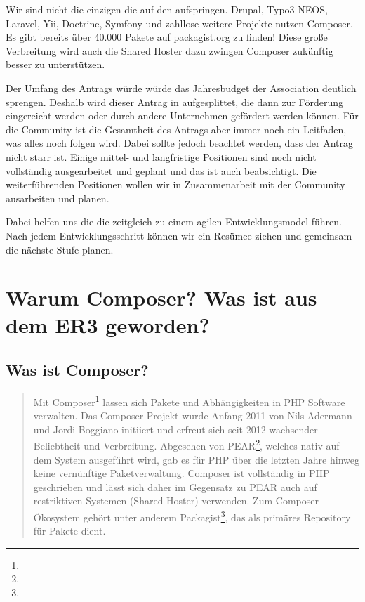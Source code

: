 \documentclass[
paper=a4,
draft=false,%
fontsize=10pt%
]{scrartcl}
\begin{document}
Wir sind nicht die einzigen die auf den  aufspringen. Drupal, Typo3 NEOS, Laravel, Yii, Doctrine, Symfony und zahllose weitere Projekte nutzen Composer. Es gibt bereits über 40.000 Pakete auf packagist.org zu finden! Diese große Verbreitung wird auch die Shared Hoster dazu zwingen Composer zukünftig besser zu unterstützen.

Der Umfang des Antrags würde würde das Jahresbudget der Association deutlich sprengen. Deshalb wird dieser Antrag in  aufgesplittet, die dann zur Förderung eingereicht werden oder durch andere Unternehmen gefördert werden können.
Für die Community ist die Gesamtheit des Antrags aber immer noch ein Leitfaden, was alles noch folgen wird.
Dabei sollte jedoch beachtet werden, dass der Antrag nicht starr ist. Einige mittel- und langfristige Positionen sind noch nicht vollständig ausgearbeitet und geplant und das ist auch beabsichtigt. Die weiterführenden Positionen wollen wir in Zusammenarbeit mit der Community ausarbeiten und planen.

Dabei helfen uns die  die zeitgleich zu einem agilen Entwicklungsmodel führen. Nach jedem Entwicklungsschritt können wir ein Resümee ziehen und gemeinsam die nächste Stufe planen.

\newpage

%
%

\section{Warum Composer? Was ist aus dem ER3 geworden?}

\subsection{Was ist Composer?}

\begin{quotation}
Mit Composer\footnote{} lassen sich Pakete und Abhängigkeiten in PHP Software verwalten. Das Composer Projekt wurde Anfang 2011 von Nils Adermann und Jordi Boggiano initiiert und erfreut sich seit 2012 wachsender Beliebtheit und Verbreitung. Abgesehen von PEAR\footnote{}, welches nativ auf dem System ausgeführt wird, gab es für PHP über die letzten Jahre hinweg keine vernünftige Paketverwaltung. Composer ist vollständig in PHP geschrieben und lässt sich daher im Gegensatz zu PEAR auch auf restriktiven Systemen (Shared Hoster) verwenden. Zum Composer-Ökosystem gehört unter anderem Packagist\footnote{}, das als primäres Repository für Pakete dient.
\end{quotation}
\end{document}
